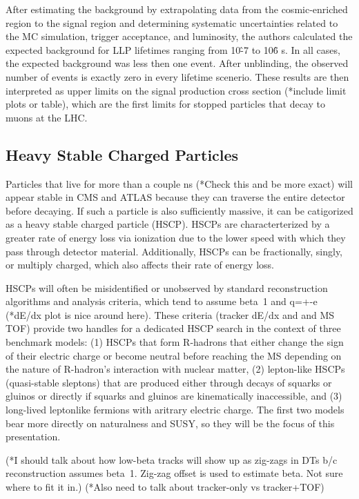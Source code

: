 \documentclass[12pt]{article}
\begin{document}
            After estimating the background by extrapolating data from the cosmic-enriched region to the signal region and determining systematic uncertainties related to the MC simulation, trigger acceptance, and luminosity, the authors calculated the expected background for LLP lifetimes ranging from 10\^-7 to 10\^6 s. In all cases, the expected background was less then one event. After unblinding, the observed number of events is exactly zero in every lifetime scenerio. These results are then interpreted as upper limits on the signal production cross section (*include limit plots or table), which are the first limits for stopped particles that decay to muons at the LHC.

\subsection{Heavy Stable Charged Particles}
            Particles that live for more than a couple ns (*Check this and be more exact) will appear stable in CMS and ATLAS because they can traverse the entire detector before decaying. If such a particle is also sufficiently massive, it can be catigorized as a heavy stable charged particle (HSCP). HSCPs are characterterized by a greater rate of energy loss via ionization due to the lower speed with which they pass through detector material. Additionally, HSCPs can be fractionally, singly, or multiply charged, which also affects their rate of energy loss. 

            HSCPs will often be misidentified or unobserved by standard reconstruction algorithms and analysis criteria, which tend to assume beta~1 and q=+-e (*dE/dx plot is nice around here). These criteria (tracker dE/dx and and MS TOF) provide two handles for a dedicated HSCP search in the context of three benchmark models: (1) HSCPs that form R-hadrons that either change the sign of their electric charge or become neutral before reaching the MS depending on the nature of R-hadron's interaction with nuclear matter, (2) lepton-like HSCPs (quasi-stable sleptons) that are produced either through decays of squarks or gluinos or directly if squarks and gluinos are kinematically inaccessible, and (3) long-lived leptonlike fermions with aritrary electric charge. The first two models bear more directly on naturalness and SUSY, so they will be the focus of this presentation.

            (*I should talk about how low-beta tracks will show up as zig-zags in DTs b/c reconstruction assumes beta~1. Zig-zag offset is used to estimate beta. Not sure where to fit it in.) (*Also need to talk about tracker-only vs tracker+TOF)
\end{document}
